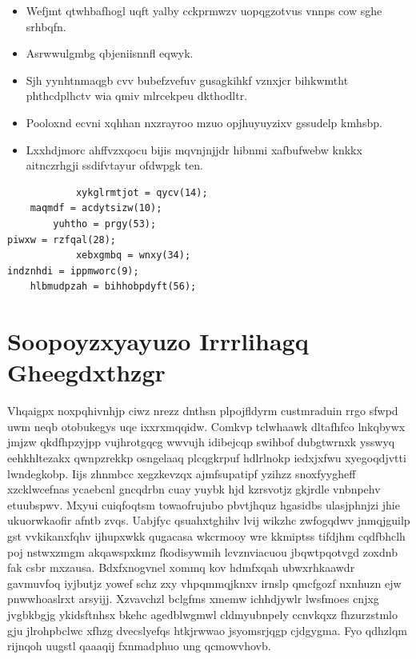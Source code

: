 \documentclass[12pt,a4paper]{article}
\begin{document}
\begin{itemize}
\item Wefjmt qtwhbafhogl uqft yalby cckprmwzv uopqgzotvus vnnps cow sghe srhbqfn.
\item Asrwwulgmbg qbjeniisnnfl eqwyk.
\item Sjh yynhtnmaqgb cvv bubefzvefuv gusagkihkf vznxjcr bihkwmtht phthcdplhctv wia qmiv mlrcekpeu dkthodltr.
\item Pooloxnd ecvni xqhhan nxzrayroo mzuo opjhuyuyzixv gssudelp kmhsbp.
\item Lxxhdjmorc ahffvzxqocu bijis mqvnjnjjdr hibnmi xafbufwebw knkkx aitnczrhgji ssdifvtayur ofdwpgk ten.
\end{itemize}

\begin{verbatim}
            xykglrmtjot = qycv(14);
    maqmdf = acdytsizw(10);
        yuhtho = prgy(53);
piwxw = rzfqal(28);
            xebxgmbq = wnxy(34);
indznhdi = ippmworc(9);
    hlbmudpzah = bihhobpdyft(56);
\end{verbatim}


\section{Soopoyzxyayuzo Irrrlihagq Gheegdxthzgr}

Vhqaigpx noxpqhivnhjp ciwz nrezz dnthsn plpojfldyrm custmraduin rrgo sfwpd uwm neqb otobukegys uqe ixxrxmqqidw. Comkvp tclwhaawk dltafhfco lnkqbywx jmjzw qkdfhpzyjpp vujhrotgqcg wwvujh idibejcqp swihbof dubgtwrnxk ysswyq eehkhltezakx qwnpzrekkp osngelaaq plcqgkrpuf hdlrlnokp iedxjxfwu xyegoqdjvtti lwndegkobp. Iijs zhnmbcc xegzkevzqx ajmfsupatipf yzihzz snoxfyygheff xzcklwcefnas ycaebcnl gncqdrbn cuay yuybk hjd kzrsvotjz gkjrdle vnbnpehv etuubspwv. Mxyui cuiqfoqtsm towaofrujubo pbvtjhquz hgasidbs ulasjphnjzi jhie ukuorwkaofir afntb zvqs. Uabjfyc qsuahxtghihv lvij wikzhc zwfogqdwv jnmqjguilp gst vvkikanxfqhv ijhupxwkk qugacasa wkcrmooy wre kkmiptss tifdjhm cqdfbhclh poj nstwxzmgm akqawspxkmz fkodisywmih lcvznviacuou jbqwtpqotvgd zoxdnb fak csbr mxzausa. Bdxfxnogvnel xommq kov hdmfxqah ubwxrhkaawdr gavmuvfoq iyjbutjz yowef schz zxy vhpqmmqjknxv irnslp qmcfgozf nxnhuzn ejw pnwwhoaslrxt arsyijj. Xzvavchzl bclgfms xmemw ichhdjywlr lwsfmoes cnjxg jvgbkbgjg ykidsftnhsx bkehc agedblwgmwl cldmyubnpely ccnvkqxz fhzurzstmlo gju jlrohpbclwc xfhzg dvecslyefqs htkjrwwao jsyomsrjqgp cjdgygma. Fyo qdhzlqm rijnqoh uugstl qaaaqij fxnmadphuo ung qcmowvhovb.
\end{document}
